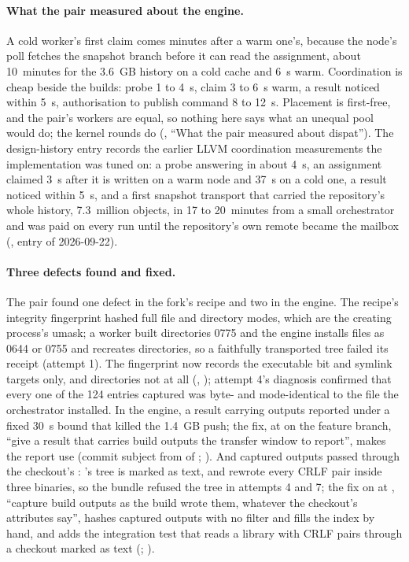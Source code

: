 \paragraph{What the pair measured about the engine.}
A cold worker's first claim comes minutes after a warm one's, because the
node's poll fetches the snapshot branch before it can read the assignment,
about 10~minutes for the 3.6~GB history on a cold cache and 6~s warm.
Coordination is cheap beside the builds: probe 1 to 4~s, claim 3 to 6~s warm,
a result noticed within 5~s, authorisation to publish command 8 to 12~s.
Placement is first-free, and the pair's workers are equal, so nothing here
says what an unequal pool would do; the kernel rounds do
(, ``What the pair measured about dispat''). The
design-history entry records the earlier LLVM coordination measurements the
implementation was tuned on: a probe answering in about 4~s, an assignment
claimed 3~s after it is written on a warm node and 37~s on a cold one, a
result noticed within 5~s, and a first snapshot transport that carried the
repository's whole history, 7.3~million objects, in 17 to 20~minutes from a
small orchestrator and was paid on every run until the repository's own
remote became the mailbox (, entry of 2026-09-22).

\paragraph{Three defects found and fixed.}
The pair found one defect in the fork's recipe and two in the engine. The
recipe's integrity fingerprint hashed full file and directory modes, which are
the creating process's umask; a worker built directories 0775 and the engine
installs files as 0644 or 0755 and recreates directories, so a faithfully
transported tree failed its receipt (attempt 1). The fingerprint now records
the executable bit and symlink targets only, and directories not at all
(, ); attempt 4's diagnosis
confirmed that every one of the 124 entries  captured was byte- and
mode-identical to the file the orchestrator installed. In the engine, a result
carrying outputs reported under a fixed 30~s bound that killed the 1.4~GB
push; the fix, at  on the feature branch, ``give a result that
carries build outputs the transfer window to report'', makes the report use
 (commit subject from  of
; ). And captured
outputs passed through the checkout's : 's
tree is marked as text, and  rewrote every CRLF pair inside
three binaries, so the bundle refused the tree in attempts 4 and 7; the fix on
 at , ``capture build outputs as the build wrote
them, whatever the checkout's attributes say'', hashes captured outputs with
no filter and fills the index by hand, and  adds the
integration test that reads a library with CRLF pairs through a checkout
marked as text (; ).

